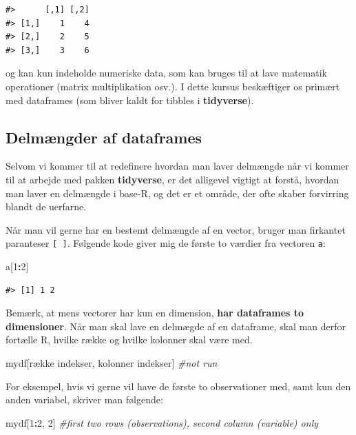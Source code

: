 \documentclass[
]{book}
\newenvironment{Shaded}{\begin{snugshade}}{\end{snugshade}}
\newcommand{\CommentTok}[1]{\textcolor[rgb]{0.37,0.37,0.37}{\textit{#1}}}
\newcommand{\DecValTok}[1]{\textcolor[rgb]{0.06,0.06,0.06}{#1}}
\newcommand{\NormalTok}[1]{#1}
\newcommand{\SpecialCharTok}[1]{\textcolor[rgb]{0.43,0.43,0.43}{\textbf{#1}}}
\begin{document}
\begin{verbatim}
#>      [,1] [,2]
#> [1,]    1    4
#> [2,]    2    5
#> [3,]    3    6
\end{verbatim}

og kan kun indeholde numeriske data, som kan bruges til at lave matematik operationer (matrix multiplikation osv.). I dette kursus beskæftiger os primært med dataframes (som bliver kaldt for tibbles i \textbf{tidyverse}).

\subsection{Delmængder af dataframes}\label{delmuxe6ngder-af-dataframes}

Selvom vi kommer til at redefinere hvordan man laver delmængde når vi kommer til at arbejde med pakken \textbf{tidyverse}, er det alligevel vigtigt at forstå, hvordan man laver en delmængde i base-R, og det er et område, der ofte skaber forvirring blandt de uerfarne.

Når man vil gerne har en bestemt delmængde af en vector, bruger man firkantet paranteser \texttt{{[}\ {]}}. Følgende kode giver mig de første to værdier fra vectoren \texttt{a}:

\begin{Shaded}
\begin{Highlighting}[]
\NormalTok{a[}\DecValTok{1}\SpecialCharTok{:}\DecValTok{2}\NormalTok{]}
\end{Highlighting}
\end{Shaded}

\begin{verbatim}
#> [1] 1 2
\end{verbatim}

Bemærk, at mens vectorer har kun en dimension, \textbf{har dataframes to dimensioner}. Når man skal lave en delmægde af en dataframe, skal man derfor fortælle R, hvilke række og hvilke kolonner skal være med.

\begin{Shaded}
\begin{Highlighting}[]
\NormalTok{mydf[række indekser, kolonner indekser]  }\CommentTok{\#not run}
\end{Highlighting}
\end{Shaded}

For eksempel, hvis vi gerne vil have de første to observationer med, samt kun den anden variabel, skriver man følgende:

\begin{Shaded}
\begin{Highlighting}[]
\NormalTok{mydf[}\DecValTok{1}\SpecialCharTok{:}\DecValTok{2}\NormalTok{, }\DecValTok{2}\NormalTok{]  }\CommentTok{\#first two rows (observations), second column (variable) only}
\end{Highlighting}
\end{Shaded}
\end{document}
